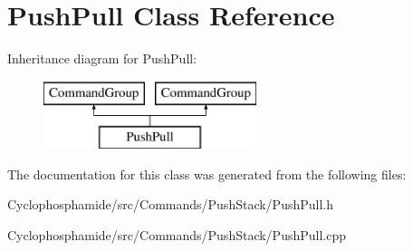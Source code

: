 \hypertarget{class_push_pull}{}\section{Push\+Pull Class Reference}
\label{class_push_pull}
Inheritance diagram for Push\+Pull\+:\begin{figure}[H]
\begin{center}
\leavevmode
\includegraphics[height=2.000000cm]{class_push_pull}
\end{center}
\end{figure}


The documentation for this class was generated from the following files\+:\begin{DoxyCompactItemize}
\item 
Cyclophosphamide/src/\+Commands/\+Push\+Stack/Push\+Pull.\+h\item 
Cyclophosphamide/src/\+Commands/\+Push\+Stack/Push\+Pull.\+cpp\end{DoxyCompactItemize}
